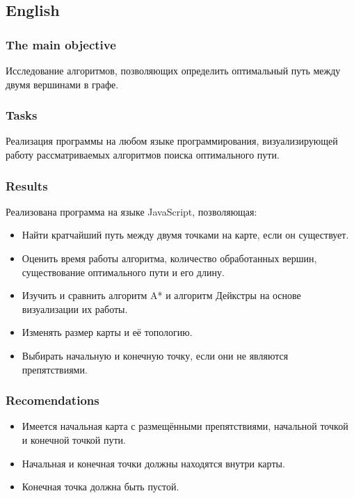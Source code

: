 \subsection{English}

\subsubsection{The main objective}
Исследование алгоритмов, позволяющих определить оптимальный путь между двумя вершинами в графе.

\subsubsection{Tasks}
Реализация программы на любом языке программирования, визуализирующей работу рассматриваемых алгоритмов поиска оптимального пути.

\subsubsection{Results}
Реализована программа на языке JavaScript, позволяющая:
\begin{itemize}
  \item Найти кратчайший путь между двумя точками на карте, если он существует.
  \item Оценить время работы алгоритма, количество обработанных вершин, существование оптимального пути и его длину.
  \item Изучить и сравнить алгоритм A* и алгоритм Дейкстры на основе визуализации их работы.
  \item Изменять размер карты и её топологию.
  \item Выбирать начальную и конечную точку, если они не являются препятствиями.
\end{itemize}

\subsubsection{Recomendations}
\begin{itemize}
  \item Имеется начальная карта с размещёнными препятствиями, начальной точкой и конечной точкой пути.
  \item Начальная и конечная точки должны находятся внутри карты.
  \item Конечная точка должна быть пустой.
\end{itemize}